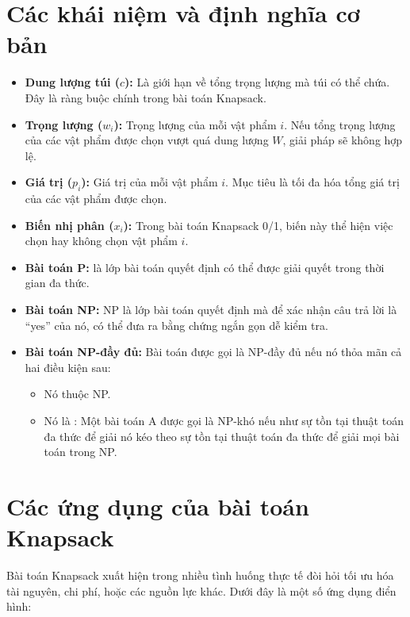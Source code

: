 \section{Các khái niệm và định nghĩa cơ bản}
\begin{itemize}
    \item \textbf{Dung lượng túi ($c$): }Là giới hạn về tổng trọng lượng mà túi có thể chứa. Đây là ràng buộc chính trong bài toán Knapsack.
    \item \textbf{Trọng lượng ($w_i$):} Trọng lượng của mỗi vật phẩm $i$. Nếu tổng trọng lượng của các vật phẩm được chọn vượt quá dung lượng $W$, giải pháp sẽ không hợp lệ.
    \item \textbf{Giá trị ($p_i$):} Giá trị của mỗi vật phẩm $i$. Mục tiêu là tối đa hóa tổng giá trị của các vật phẩm được chọn.
    \item \textbf{Biến nhị phân ($x_i$):} Trong bài toán Knapsack 0/1, biến này thể hiện việc chọn hay không chọn vật phẩm $i$.
    \item \textbf{Bài toán P: }  là lớp bài toán quyết định có thể được giải quyết trong thời gian đa thức.
    \item  \textbf{Bài toán NP:} NP là lớp bài toán quyết định mà
    để xác nhận câu trả lời là “yes” của nó, có thể đưa ra bằng chứng ngắn gọn dễ kiểm tra.
    \item \textbf{Bài toán NP-đầy đủ:} Bài toán được gọi là NP-đầy đủ nếu nó thỏa mãn cả hai điều kiện sau:
    \begin{itemize}
        \item Nó thuộc NP.
        \item Nó là : Một bài toán A được gọi là NP-khó
        nếu như sự tồn tại thuật toán đa thức để giải nó kéo
        theo sự tồn tại thuật toán đa thức để giải mọi bài
        toán trong NP.
    \end{itemize}
\end{itemize}

\section{Các ứng dụng của bài toán Knapsack}
Bài toán Knapsack xuất hiện trong nhiều tình huống thực tế đòi hỏi tối ưu hóa tài nguyên, chi phí, hoặc các nguồn lực khác. Dưới đây là một số ứng dụng điển hình:

